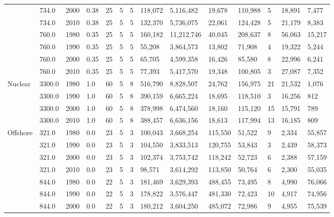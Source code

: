 \begin{table}[]
\begin{tabular}{|l|l|l|l|l|l|l|l|l|l|l|l|l|l|}
		& 734.0 & 2000 & 0.38 & 25 & 5 & 5 & 118,072 & 5,116,482 & 19,678 & 110,988 & 5 & 18,891 & 7,477 \\ \cline{2-14} 
		& 734.0 & 2010 & 0.38 & 25 & 5 & 5 & 132,370 & 5,736,075 & 22,061 & 124,428 & 5 & 21,179 & 8,383 \\ \cline{2-14} 
		& 760.0 & 1980 & 0.35 & 25 & 5 & 5 & 160,182 & 11,212,746 & 40,045 & 208,637 & 8 & 56,063 & 15,217 \\ \cline{2-14} 
		& 760.0 & 1990 & 0.35 & 25 & 5 & 5 & 55,208 & 3,864,573 & 13,802 & 71,908 & 4 & 19,322 & 5,244 \\ \cline{2-14} 
		& 760.0 & 2000 & 0.35 & 25 & 5 & 5 & 65,705 & 4,599,358 & 16,426 & 85,580 & 8 & 22,996 & 6,241 \\ \cline{2-14} 
		& 760.0 & 2010 & 0.35 & 25 & 5 & 5 & 77,393 & 5,417,570 & 19,348 & 100,805 & 3 & 27,087 & 7,352 \\ \hline
		\multirow{4}{*}{Nuclear} & 3300.0 & 1980 & 1.0 & 60 & 5 & 8 & 516,790 & 8,828,507 & 24,762 & 156,975 & 21 & 21,532 & 1,076 \\ \cline{2-14} 
		& 3300.0 & 1990 & 1.0 & 60 & 5 & 8 & 390,159 & 6,665,224 & 18,695 & 118,510 & 3 & 16,256 & 812 \\ \cline{2-14} 
		& 3300.0 & 2000 & 1.0 & 60 & 5 & 8 & 378,998 & 6,474,560 & 18,160 & 115,120 & 15 & 15,791 & 789 \\ \cline{2-14} 
		& 3300.0 & 2010 & 1.0 & 60 & 5 & 8 & 388,457 & 6,636,156 & 18,613 & 117,994 & 13 & 16,185 & 809 \\ \hline
		\multirow{8}{*}{Offshore} & 321.0 & 1980 & 0.0 & 23 & 5 & 3 & 100,043 & 3,668,254 & 115,550 & 51,522 & 9 & 2,334 & 55,857 \\ \cline{2-14} 
		& 321.0 & 1990 & 0.0 & 23 & 5 & 3 & 104,550 & 3,833,513 & 120,755 & 53,843 & 3 & 2,439 & 58,373 \\ \cline{2-14} 
		& 321.0 & 2000 & 0.0 & 23 & 5 & 3 & 102,374 & 3,753,742 & 118,242 & 52,723 & 6 & 2,388 & 57,159 \\ \cline{2-14} 
		& 321.0 & 2010 & 0.0 & 23 & 5 & 3 & 98,571 & 3,614,292 & 113,850 & 50,764 & 6 & 2,300 & 55,035 \\ \cline{2-14} 
		& 844.0 & 1980 & 0.0 & 22 & 5 & 3 & 181,469 & 3,629,393 & 488,455 & 73,495 & 8 & 4,990 & 76,066 \\ \cline{2-14} 
		& 844.0 & 1990 & 0.0 & 22 & 5 & 3 & 178,822 & 3,576,447 & 481,330 & 72,423 & 10 & 4,917 & 74,956 \\ \cline{2-14} 
		& 844.0 & 2000 & 0.0 & 22 & 5 & 3 & 180,212 & 3,604,250 & 485,072 & 72,986 & 9 & 4,955 & 75,539 \\ \cline{2-14} 

\end{tabular}
\end{table}
